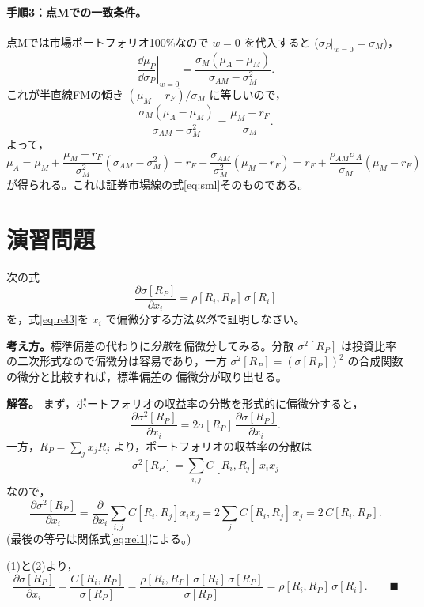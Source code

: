 \paragraph{手順3：点Mでの一致条件。}
点Mでは市場ポートフォリオ100\%なので $w=0$ を代入すると
($\sigma_P|_{w=0} = \sigma_M$)，
\begin{equation}
\left.\frac{\dd\mu_P}{\dd\sigma_P}\right|_{w=0}
= \frac{\sigma_M(\mu_A - \mu_M)}{\sigma_{AM} - \sigma_M^2}.
\end{equation}
これが半直線FMの傾き $(\mu_M - r_F)/\sigma_M$ に等しいので，
\[
\frac{\sigma_M(\mu_A-\mu_M)}{\sigma_{AM}-\sigma_M^2}
= \frac{\mu_M - r_F}{\sigma_M}.
\]
よって，
\begin{equation}
\mu_A = \mu_M + \frac{\mu_M - r_F}{\sigma_M^2}(\sigma_{AM} - \sigma_M^2)
= r_F + \frac{\sigma_{AM}}{\sigma_M^2}(\mu_M - r_F)
= r_F + \frac{\rho_{AM}\sigma_A}{\sigma_M}(\mu_M - r_F)
\end{equation}
が得られる。これは証券市場線の式\eqref{eq:sml}そのものである。

\section{演習問題}

\begin{exercise}[問題1]
次の式
\[
\frac{\partial\sigma[R_P]}{\partial x_i} = \rho[R_i,R_P]\,\sigma[R_i]
\]
を，式\eqref{eq:rel3}を $x_i$ で偏微分する方法\emph{以外}で証明しなさい。
\end{exercise}

\begin{answerbox}
\textbf{考え方。}標準偏差の代わりに\emph{分散}を偏微分してみる。分散
$\sigma^2[R_P]$ は投資比率の二次形式なので偏微分は容易であり，一方
$\sigma^2[R_P] = (\sigma[R_P])^2$ の合成関数の微分と比較すれば，標準偏差の
偏微分が取り出せる。

\medskip
\textbf{解答。}
まず，ポートフォリオの収益率の分散を形式的に偏微分すると，
\begin{equation}
\frac{\partial\sigma^2[R_P]}{\partial x_i}
= 2\sigma[R_P]\,\frac{\partial\sigma[R_P]}{\partial x_i}.
\tag{1}
\end{equation}
一方，$R_P = \sum_j x_j R_j$ より，ポートフォリオの収益率の分散は
\[
\sigma^2[R_P] = \sum_{i,j} C[R_i,R_j]\,x_i x_j
\]
なので，
\begin{equation}
\frac{\partial\sigma^2[R_P]}{\partial x_i}
= \frac{\partial}{\partial x_i}\sum_{i,j}C[R_i,R_j]x_ix_j
= 2\sum_{j} C[R_i,R_j]\,x_j = 2\,C[R_i,R_P].
\tag{2}
\end{equation}
(最後の等号は関係式\eqref{eq:rel1}による。)

(1)と(2)より，
\[
\frac{\partial\sigma[R_P]}{\partial x_i}
= \frac{C[R_i,R_P]}{\sigma[R_P]}
= \frac{\rho[R_i,R_P]\,\sigma[R_i]\,\sigma[R_P]}{\sigma[R_P]}
= \rho[R_i,R_P]\,\sigma[R_i].
\qquad\blacksquare
\]
\end{answerbox}

